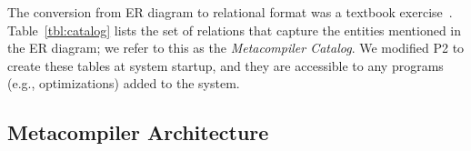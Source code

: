 The conversion from ER diagram to relational format was a textbook
exercise~\cite{DBTextbook}.  Table~\ref{tbl:catalog} lists the set of relations
that capture the entities mentioned in the ER diagram; we refer to this as the
{\em Metacompiler Catalog}.  We modified P2 to create these tables at system
startup, and they are accessible to any \OVERLOG programs (e.g., optimizations)
added to the system.

\subsection{Metacompiler Architecture}
\label{ch:evita:sec:arch}
  

